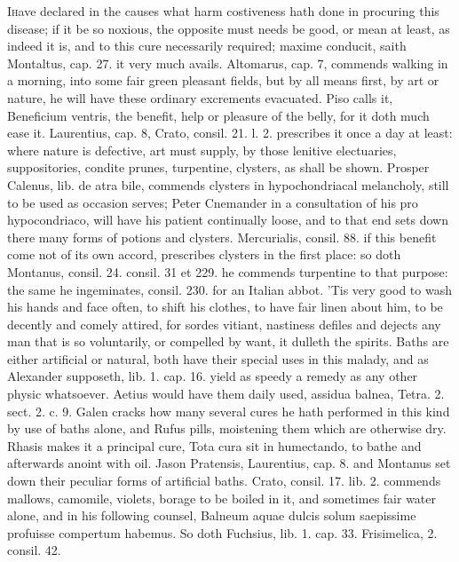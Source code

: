 {\lettrine{I} have declared in the causes what harm costiveness hath done in
procuring this disease; if it be so noxious, the opposite must needs be
good, or mean at least, as indeed it is, and to this cure necessarily
required; maxime conducit, saith Montaltus, cap. 27. it very much
avails.  Altomarus, cap. 7, commends walking in a morning, into
some fair green pleasant fields, but by all means first, by art or
nature, he will have these ordinary excrements evacuated. Piso calls
it, Beneficium ventris, the benefit, help or pleasure of the belly, for
it doth much ease it. Laurentius, cap. 8, Crato, consil. 21. l. 2.
prescribes it once a day at least: where nature is defective, art must
supply, by those lenitive electuaries, suppositories, condite prunes,
turpentine, clysters, as shall be shown. Prosper Calenus, lib. de atra
bile, commends clysters in hypochondriacal melancholy, still to be used
as occasion serves;  Peter Cnemander in a consultation of his pro
hypocondriaco, will have his patient continually loose, and to that end
sets down there many forms of potions and clysters. Mercurialis,
consil. 88. if this benefit come not of its own accord, prescribes
clysters in the first place: so doth Montanus, consil. 24.
consil. 31 et 229. he commends turpentine to that purpose: the same he
ingeminates, consil. 230. for an Italian abbot. 'Tis very good to wash
his hands and face often, to shift his clothes, to have fair linen
about him, to be decently and comely attired, for sordes vitiant,
nastiness defiles and dejects any man that is so voluntarily, or
compelled by want, it dulleth the spirits.
Baths are either artificial or natural, both have their special uses in
this malady, and as Alexander supposeth, lib. 1. cap. 16. yield
as speedy a remedy as any other physic whatsoever. Aetius would have
them daily used, assidua balnea, Tetra. 2. sect. 2. c. 9. Galen cracks
how many several cures he hath performed in this kind by use of baths
alone, and Rufus pills, moistening them which are otherwise dry. Rhasis
makes it a principal cure, Tota cura sit in humectando, to bathe and
afterwards anoint with oil. Jason Pratensis, Laurentius, cap. 8. and
Montanus set down their peculiar forms of artificial baths. Crato,
consil. 17. lib. 2. commends mallows, camomile, violets, borage to be
boiled in it, and sometimes fair water alone, and in his following
counsel, Balneum aquae dulcis solum saepissime profuisse compertum
habemus. So doth Fuchsius, lib. 1. cap. 33. Frisimelica, 2. consil. 42.
}
